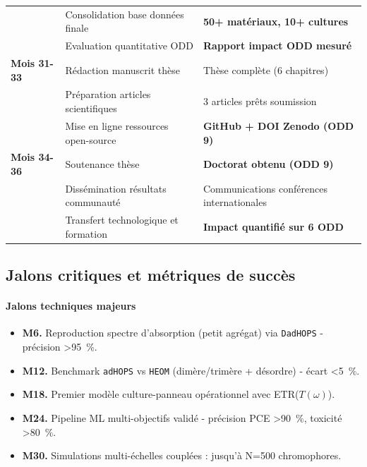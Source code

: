\documentclass[12pt, a4paper]{article}
\begin{document}
\begin{longtable}{@{}lp{}p{}@{}}
     & Consolidation base données finale & \textbf{50+ matériaux, 10+ cultures} \\
     & Evaluation quantitative ODD & \textbf{Rapport impact ODD mesuré} \\
    \midrule
    \textbf{Mois 31-33} & Rédaction manuscrit thèse & Thèse complète (6 chapitres) \\
     & Préparation articles scientifiques & 3 articles prêts soumission \\
     & Mise en ligne ressources open-source & \textbf{GitHub + DOI Zenodo (ODD 9)} \\
    \midrule
    \textbf{Mois 34-36} & Soutenance thèse & \textbf{Doctorat obtenu (ODD 9)} \\
     & Dissémination résultats communauté & Communications conférences internationales \\
     & Transfert technologique et formation & \textbf{Impact quantifié sur 6 ODD} \\
\end{longtable}

\subsection{Jalons critiques et métriques de succès}

\paragraph{Jalons techniques majeurs}
\begin{itemize}
    \item \textbf{M6.} Reproduction spectre d'absorption (petit agrégat) via \texttt{DadHOPS} - précision \SI{>95}{\percent}.
    \item \textbf{M12.} Benchmark \texttt{adHOPS} vs \texttt{HEOM} (dimère/trimère + désordre) - écart \SI{<5}{\percent}.
    \item \textbf{M18.} Premier modèle culture-panneau opérationnel avec ETR($T(\omega)$).
    \item \textbf{M24.} Pipeline ML multi-objectifs validé - précision PCE \SI{>90}{\percent}, toxicité \SI{>80}{\percent}.
    \item \textbf{M30.} Simulations multi-échelles couplées : jusqu'à N=\num{500} chromophores.
\end{itemize}
\end{document}
